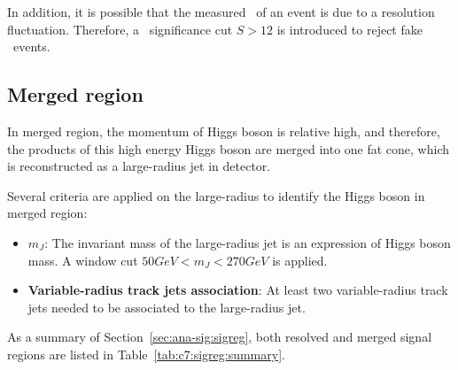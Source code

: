 \par In addition, it is possible that the measured \met~of an event is due to a resolution fluctuation. Therefore, a \met~significance cut $S>12$ is introduced to reject fake \met~events.

\subsection{Merged region}

\par In merged region, the momentum of Higgs boson is relative high, and therefore, the products of this high energy Higgs boson are merged into one fat cone, which is reconstructed as a large-radius jet in detector.
\par Several criteria are applied on the large-radius to identify the Higgs boson in merged region:
\begin{itemize}
    \item \textbf{$m_{J}$}: The invariant mass of the large-radius jet is an expression of Higgs boson mass. A window cut $50GeV<m_{J}<270GeV$ is applied.
    \item \textbf{Variable-radius track jets association}: At least two variable-radius track jets needed to be associated to the large-radius jet.
\end{itemize}

\par As a summary of Section~\ref{sec:ana-sig:sigreg}, both resolved and merged signal regions are listed in Table~\ref{tab:c7:sigreg:summary}.

